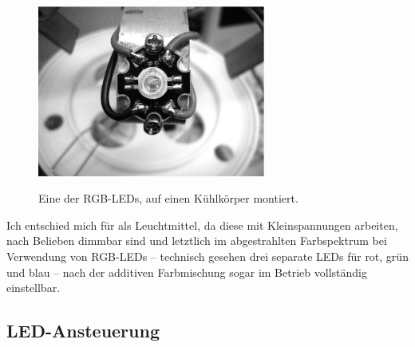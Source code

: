 \documentclass[12pt,a4paper,notitlepage]{article}
\begin{document}
\begin{figure}
\centering
\includegraphics[width=7.5cm]{images/led_closeup.eps}
\label{rgb_led}
\caption{Eine der RGB-LEDs, auf einen Kühlkörper montiert.}
\end{figure}

Ich entschied mich für  als Leuchtmittel, da diese mit Kleinspannungen arbeiten, nach Belieben dimmbar sind und letztlich im abgestrahlten Farbspektrum bei Verwendung von RGB-LEDs -- technisch gesehen drei separate LEDs für rot, grün und blau -- nach der additiven Farbmischung\cite{WP10} sogar im Betrieb vollständig einstellbar.

\subsection{LED-Ansteuerung}
\end{document}
